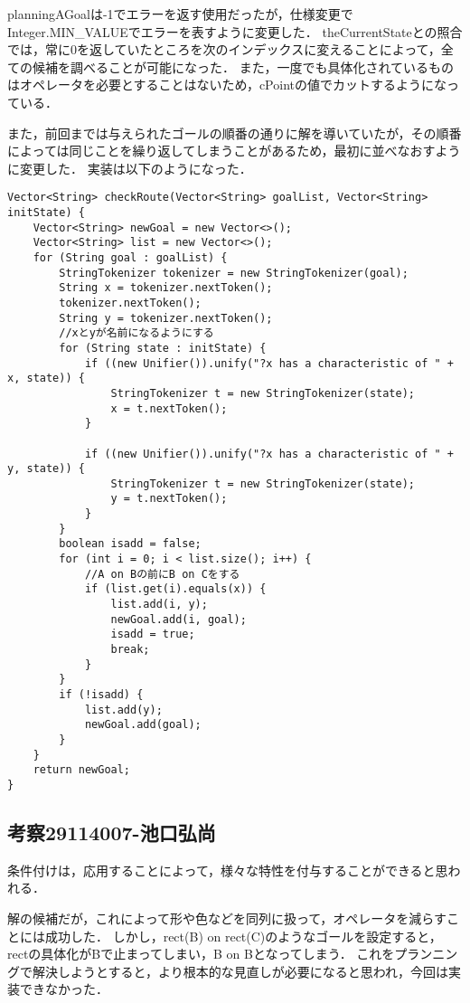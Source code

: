 \documentclass{jarticle}
\begin{document}
planningAGoalは-1でエラーを返す使用だったが，仕様変更でInteger.MIN\_VALUEでエラーを表すように変更した．
theCurrentStateとの照合では，常に0を返していたところを次のインデックスに変えることによって，全ての候補を調べることが可能になった．
また，一度でも具体化されているものはオペレータを必要とすることはないため，cPointの値でカットするようになっている．
\newline

また，前回までは与えられたゴールの順番の通りに解を導いていたが，その順番によっては同じことを繰り返してしまうことがあるため，最初に並べなおすように変更した．
実装は以下のようになった．

\begin{lstlisting}[caption=ゴールリストの中身を並べなおす,label=src:blockList]
Vector<String> checkRoute(Vector<String> goalList, Vector<String> initState) {
    Vector<String> newGoal = new Vector<>();
    Vector<String> list = new Vector<>();
    for (String goal : goalList) {
        StringTokenizer tokenizer = new StringTokenizer(goal);
        String x = tokenizer.nextToken();
        tokenizer.nextToken();
        String y = tokenizer.nextToken();
        //xとyが名前になるようにする
        for (String state : initState) {
            if ((new Unifier()).unify("?x has a characteristic of " + x, state)) {
                StringTokenizer t = new StringTokenizer(state);
                x = t.nextToken();
            }
            
            if ((new Unifier()).unify("?x has a characteristic of " + y, state)) {
                StringTokenizer t = new StringTokenizer(state);
                y = t.nextToken();
            }
        }
        boolean isadd = false;
        for (int i = 0; i < list.size(); i++) {
            //A on Bの前にB on Cをする
            if (list.get(i).equals(x)) {
                list.add(i, y);
                newGoal.add(i, goal);
                isadd = true;
                break;
            }
        }
        if (!isadd) {
            list.add(y);
            newGoal.add(goal);
        }
    }
    return newGoal;
}
\end{lstlisting}

\subsection{考察29114007-池口弘尚}
条件付けは，応用することによって，様々な特性を付与することができると思われる．

解の候補だが，これによって形や色などを同列に扱って，オペレータを減らすことには成功した．
しかし，rect(B) on rect(C)のようなゴールを設定すると，rectの具体化がBで止まってしまい，B on Bとなってしまう．
これをプランニングで解決しようとすると，より根本的な見直しが必要になると思われ，今回は実装できなかった．
\end{document}
